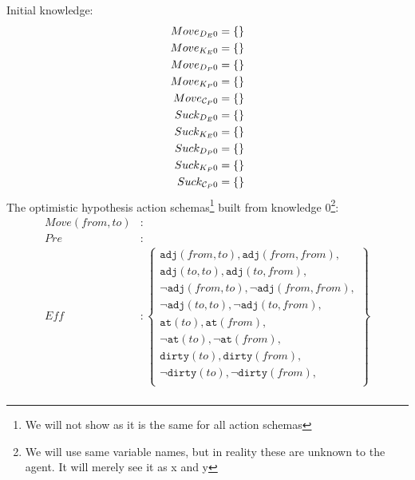 \documentclass[\master/Master.tex]{subfiles}
\begin{document}
Initial knowledge:
\begin{align*}
	Move_{D_E0} &=\{\} \\
	Move_{K_E0} &=\{\} \\	
	Move_{D_P0} &=\{\} \\
	Move_{K_P0} &=\{\} \\
	Move_{\mathcal{C}_P0}& =\{\} \\	
	Suck_{D_E0} &=\{\} \\
	Suck_{K_E0} &=\{\} \\	
	Suck_{D_P0} &=\{\} \\
	Suck_{K_P0} &=\{\} \\
	Suck_{\mathcal{C}_P0}& =\{\} 	
\end{align*}
The optimistic hypothesis action schemas\footnote{We will not show \lits as it is the same for all action schemas} built from knowledge 0\footnote{We will use same variable names, but in reality these are unknown to the agent. It will merely see it as x and y}:
\begin{align*}
	Move(from,to) &: \\
	Pre &: 
	\\
	Eff &: 
	\left\{
	\begin{gathered}
		\texttt{adj}(from,to), \texttt{adj}(from,from), \\
		\texttt{adj}(to,to), \texttt{adj}(to,from), \\
		\neg \texttt{adj}(from,to), \neg \texttt{adj}(from,from), \\
		\neg \texttt{adj}(to,to), \neg \texttt{adj}(to,from), \\					
		\texttt{at}(to), \texttt{at}(from), \\
		\neg \texttt{at}(to), \neg \texttt{at}(from), \\					
		\texttt{dirty}(to), \texttt{dirty}(from), \\
		\neg \texttt{dirty}(to), \neg \texttt{dirty}(from), \\
	\end{gathered}
	\right\}
	\\
\end{align*}
\end{document}
